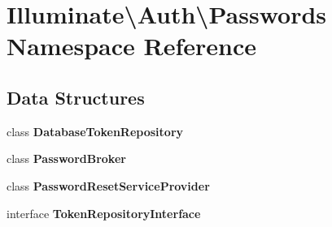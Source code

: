 \section{Illuminate\textbackslash{}Auth\textbackslash{}Passwords Namespace Reference}
\label{namespace_illuminate_1_1_auth_1_1_passwords}
\subsection*{Data Structures}
\begin{DoxyCompactItemize}
\item 
class {\bf Database\+Token\+Repository}
\item 
class {\bf Password\+Broker}
\item 
class {\bf Password\+Reset\+Service\+Provider}
\item 
interface {\bf Token\+Repository\+Interface}
\end{DoxyCompactItemize}
